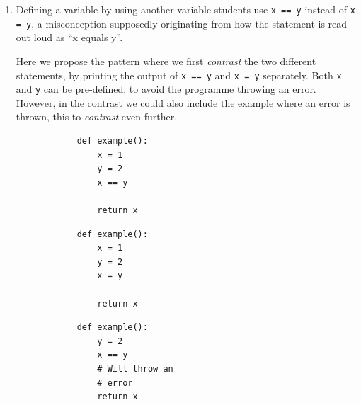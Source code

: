 \begin{enumerate}
\begin{verbatim}
            maximum = 4
            my_list = [1, 3, 2, 5, 4]
            example()
        \end{verbatim}
\hfill

The pattern ends with a fusion of the two.
\hfill
        \begin{verbatim}
            def example():
                for value in list:
                    if value > maximum:
                        maximum = value


            maximum = 4
            my_list = [1, 3, 2, 5, 4]
            example()
        \end{verbatim}

\hfill
    
    \item Defining a variable by using another variable students use 
      \texttt{x == y} instead of \texttt{x = y}, a 
      misconception supposedly originating from how the statement is read 
out 
      loud as \enquote{x equals y}.

      Here we propose the pattern where we first \emph{contrast} the two
different statements, by printing the output of
\texttt{x == y} and \texttt{x = y} separately.
Both \texttt{x} and \texttt{y} can be pre-defined,
to avoid the programme throwing an error. However, in the contrast we could
also include the example where an error is thrown, this to
\emph{contrast} even further.

      \hfill
     \begin{minipage}[t]{0.3\columnwidth}
        \begin{verbatim}
            def example():
                x = 1
                y = 2
                x == y
    
                return x
        \end{verbatim}
    \end{minipage}
\hfill
    \begin{minipage}[t]{0.3\columnwidth}
        \begin{verbatim}
            def example():
                x = 1
                y = 2
                x = y
                
                return x
        \end{verbatim}
    \end{minipage}
\hfill
    \begin{minipage}[t]{0.3\columnwidth}
        \begin{verbatim}
            def example():
                y = 2
                x == y 
                # Will throw an 
                # error
                return x
        \end{verbatim}
    \end{minipage}
\hfill
    

\end{enumerate}

